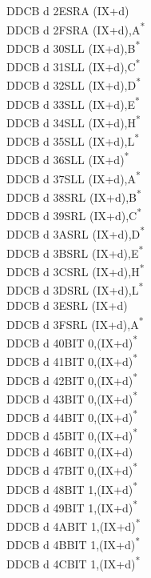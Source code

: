 \documentclass[twoside,openright,a4paper]{book}
\begin{document}
\begin{multicols}{3}
{\begin{tabbing}
	DDCB d 2E\>SRA (IX+d)\\
	DDCB d 2F\>SRA (IX+d),A\textsuperscript{*}\\
	DDCB d 30\>SLL (IX+d),B\textsuperscript{*}\\
	DDCB d 31\>SLL (IX+d),C\textsuperscript{*}\\
	DDCB d 32\>SLL (IX+d),D\textsuperscript{*}\\
	DDCB d 33\>SLL (IX+d),E\textsuperscript{*}\\
	DDCB d 34\>SLL (IX+d),H\textsuperscript{*}\\
	DDCB d 35\>SLL (IX+d),L\textsuperscript{*}\\
	DDCB d 36\>SLL (IX+d)\textsuperscript{*}\\
	DDCB d 37\>SLL (IX+d),A\textsuperscript{*}\\
	DDCB d 38\>SRL (IX+d),B\textsuperscript{*}\\
	DDCB d 39\>SRL (IX+d),C\textsuperscript{*}\\
	DDCB d 3A\>SRL (IX+d),D\textsuperscript{*}\\
	DDCB d 3B\>SRL (IX+d),E\textsuperscript{*}\\
	DDCB d 3C\>SRL (IX+d),H\textsuperscript{*}\\
	DDCB d 3D\>SRL (IX+d),L\textsuperscript{*}\\
	DDCB d 3E\>SRL (IX+d)\\
	DDCB d 3F\>SRL (IX+d),A\textsuperscript{*}\\
	DDCB d 40\>BIT 0,(IX+d)\textsuperscript{*}\\
	DDCB d 41\>BIT 0,(IX+d)\textsuperscript{*}\\
	DDCB d 42\>BIT 0,(IX+d)\textsuperscript{*}\\
	DDCB d 43\>BIT 0,(IX+d)\textsuperscript{*}\\
	DDCB d 44\>BIT 0,(IX+d)\textsuperscript{*}\\
	DDCB d 45\>BIT 0,(IX+d)\textsuperscript{*}\\
	DDCB d 46\>BIT 0,(IX+d)\\
	DDCB d 47\>BIT 0,(IX+d)\textsuperscript{*}\\
	DDCB d 48\>BIT 1,(IX+d)\textsuperscript{*}\\
	DDCB d 49\>BIT 1,(IX+d)\textsuperscript{*}\\
	DDCB d 4A\>BIT 1,(IX+d)\textsuperscript{*}\\
	DDCB d 4B\>BIT 1,(IX+d)\textsuperscript{*}\\
	DDCB d 4C\>BIT 1,(IX+d)\textsuperscript{*}\\

\end{tabbing}}
\end{multicols}
\end{document}
